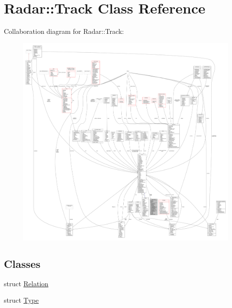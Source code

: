 \hypertarget{classRadar_1_1Track}{}\section{Radar\+:\+:Track Class Reference}
\label{classRadar_1_1Track}


Collaboration diagram for Radar\+:\+:Track\+:
\nopagebreak
\begin{figure}[H]
\begin{center}
\leavevmode
\includegraphics[width=350pt]{dc/d66/classRadar_1_1Track__coll__graph}
\end{center}
\end{figure}
\subsection*{Classes}
\begin{DoxyCompactItemize}
\item 
struct \hyperlink{structRadar_1_1Track_1_1Relation}{Relation}
\item 
struct \hyperlink{structRadar_1_1Track_1_1Type}{Type}
\end{DoxyCompactItemize}
